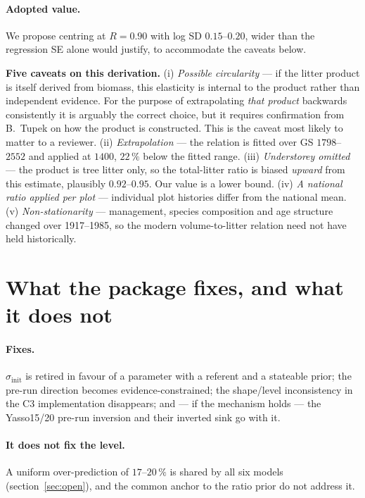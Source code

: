 \documentclass[11pt]{article}
\newcommand{\sinit}{\sigma_{\mathrm{init}}}
\begin{document}
\paragraph{Adopted value.} We propose centring at $R = 0.90$ with log SD $0.15$--$0.20$, wider
than the regression SE alone would justify, to accommodate the caveats below.

\begin{caveat}
\textbf{Five caveats on this derivation.}
(i) \emph{Possible circularity} --- if the litter product is itself derived from biomass, this
elasticity is internal to the product rather than independent evidence. For the purpose of
extrapolating \emph{that product} backwards consistently it is arguably the correct choice, but
it requires confirmation from B.~Tupek on how the product is constructed. This is the caveat
most likely to matter to a reviewer.
(ii) \emph{Extrapolation} --- the relation is fitted over GS $1798$--$2552$ and applied at
$1400$, $22\,\%$ below the fitted range.
(iii) \emph{Understorey omitted} --- the product is tree litter only, so the total-litter ratio
is biased \emph{upward} from this estimate, plausibly $0.92$--$0.95$. Our value is a lower bound.
(iv) \emph{A national ratio applied per plot} --- individual plot histories differ from the
national mean.
(v) \emph{Non-stationarity} --- management, species composition and age structure changed over
1917--1985, so the modern volume-to-litter relation need not have held historically.
\end{caveat}

\section{What the package fixes, and what it does not}\label{sec:effect}

\paragraph{Fixes.} $\sinit$ is retired in favour of a parameter with a referent and a
stateable prior; the pre-run direction becomes evidence-constrained; the shape/level
inconsistency in the C3 implementation disappears; and --- if the mechanism holds --- the
Yasso15/20 pre-run inversion and their inverted sink go with it.

\paragraph{It does not fix the level.} A uniform over-prediction of $17$--$20\,\%$ is shared by
all six models (section~\ref{sec:open}), and the common anchor to the ratio prior do not address it.
\end{document}
